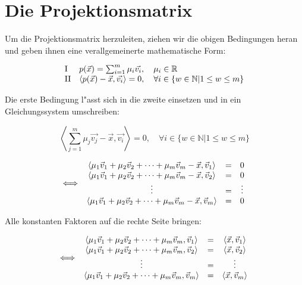 \documentclass{article}
\newcommand{\rz}[1]{\ensuremath{\mathord{\mathrm{#1}}}}
\newcommand{\lrangle}[1]{\left\langle #1 \right\rangle}
\begin{document}
\section{Die Projektionsmatrix}
Um die Projektionsmatrix herzuleiten, ziehen wir die obigen Bedingungen heran und geben ihnen eine
verallgemeinerte mathematische Form:

	\begin{equation}
		\begin{array}{l l}
			\rz{I}  &
			p(\vec{x}) = \sum_{i=1}^{m}{\mu _i\vec{v_i}}, \quad \mu _i \in \mathbb{R} \\
			\rz{II} &
			\lrangle{ p(\vec{x}) - \vec{x}, \vec{v_i} } = 0, \quad \forall i \in \{ w \in
			  \mathbb{N} | 1 \leq w \leq m \}
		\end{array}
	\end{equation}

Die erste Bedingung l"asst sich in die zweite einsetzen und in ein Gleichungssystem umschreiben:

	\begin{equation}
		\lrangle{ \sum_{j=1}^{m}{\mu _j\vec{v_j}} - \vec{x}, \vec{v_i} } = 0, \quad \forall i
		  \in \{ w \in \mathbb{N} | 1 \leq w \leq m \}
	\end{equation}

	\begin{equation}
		\iff
		\begin{array}{c c c}
			\lrangle{ \mu _1 \vec{v}_1 + \mu _2 \vec{v}_2 + \cdots + \mu _m \vec{v}_m - \vec{x},
			  \vec{v}_1 } &
			= &
			0 \\
			\lrangle{ \mu _1 \vec{v}_1 + \mu _2 \vec{v}_2 + \cdots + \mu _m \vec{v}_m - \vec{x},
			  \vec{v}_2 } &
			= &
			0 \\
			\vdots &
			= &
			\vdots \\
			\lrangle{ \mu _1 \vec{v}_1 + \mu _2 \vec{v}_2 + \cdots + \mu _m \vec{v}_m - \vec{x},
			  \vec{v}_m } &
			= &
			0
		\end{array}
	\end{equation}

Alle konstanten Faktoren auf die rechte Seite bringen:

	\begin{equation}
		\iff
		\begin{array}{c c c}
			\lrangle{ \mu _1 \vec{v}_1 + \mu _2 \vec{v}_2 + \cdots + \mu _m \vec{v}_m,
			  \vec{v}_1 } & = & \lrangle{ \vec{x}, \vec{v}_1 } \\
			\lrangle{ \mu _1 \vec{v}_1 + \mu _2 \vec{v}_2 + \cdots + \mu _m \vec{v}_m,
			  \vec{v}_2 } & = & \lrangle{ \vec{x}, \vec{v}_2 } \\
			\vdots & = & \vdots \\
			\lrangle{ \mu _1 \vec{v}_1 + \mu _2 \vec{v}_2 + \cdots + \mu _m \vec{v}_m,
			  \vec{v}_m } & = & \lrangle{ \vec{x}, \vec{v}_m }
		\end{array}
	\end{equation}
\end{document}
